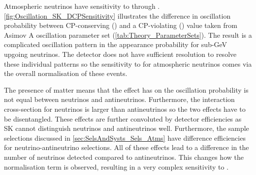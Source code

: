 Atmospheric neutrinos have sensitivity to \dcp through  . \autoref{fig:Oscillation_SK_DCPSensitivity} illustrates the difference in oscillation probability between CP-conserving () and a CP-violating () value taken from Asimov A oscillation parameter set (\autoref{tab:Theory_ParameterSets}). The result is a complicated oscillation pattern in the appearance probability for sub-GeV upgoing neutrinos. The detector does not have sufficient resolution to resolve these individual patterns so the sensitivity to \dcp for atmospheric neutrinos comes via the overall normalisation of these events.


The presence of matter means that the effect \dcp has on the oscillation probability is not equal between neutrinos and antineutrinos. Furthermore, the interaction cross-section for neutrinos is larger than antineutrinos so the two effects have to be disentangled. These effects are further convoluted by detector efficiencies as SK cannot distinguish neutrinos and antineutrinos well. Furthermore, the sample selections discussed in \autoref{sec:SelsAndSysts_Sels_Atms} have difference efficiencies for neutrino-antineutrino selections. All of these effects lead to a difference in the number of neutrinos detected compared to antineutrinos. This changes how the \dcp normalisation term is observed, resulting in a very complex sensitivity to \dcp.

